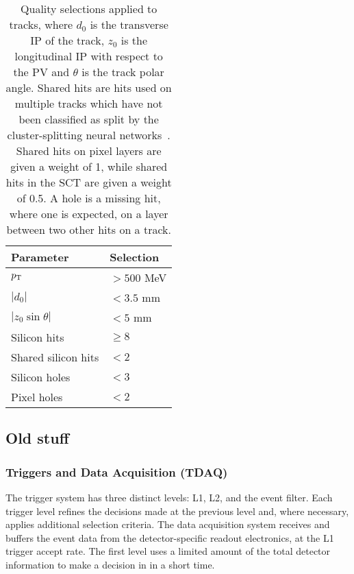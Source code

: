 \begin{table}[!htbp]
  \footnotesize\centering
  \setlength{\tabcolsep}{0.5em} %
  \caption{
    Quality selections applied to tracks,
    where $d_0$ is the transverse IP of the track, $z_0$ is the longitudinal IP with respect to the PV and $\theta$ is the track polar angle.
    Shared hits are hits used on multiple tracks which have not been classified as split by the cluster-splitting neural networks~\cite{PERF-2015-08}.
    Shared hits on pixel layers are given a weight of 1, while shared hits in the SCT are given a weight of 0.5.
    A hole is a missing hit, where one is expected, on a layer between two other hits on a track.
    }
  \begin{tabular}{ll}
    \toprule 
    \textbf{Parameter} & \textbf{Selection} \\
    \hline
    $p_{\text{T}}$                & $> 500$ MeV \\
    $|d_0|$              & $< 3.5$ mm \\
    $|z_0 \sin\theta|$   & $< 5$ mm \\
    Silicon hits         & $\ge 8$ \\
    Shared silicon hits  & $< 2$ \\
    Silicon holes        & $< 3$ \\
    Pixel holes          & $< 2$ \\
    \bottomrule
  \end{tabular}
  \vspace{4mm}
  \label{tab:track_selections}
\end{table}

\subsection{Old stuff}


\subsubsection{Triggers and Data Acquisition (TDAQ)}

The trigger system has three distinct levels: L1, L2, and the event filter. Each trigger level refines the decisions made at the previous level and, where necessary, applies additional selection criteria. The data acquisition system receives and buffers the event data from the detector-specific readout electronics, at the L1 trigger accept rate. The first level uses a limited amount of the total detector information to make a decision in in a short time.



